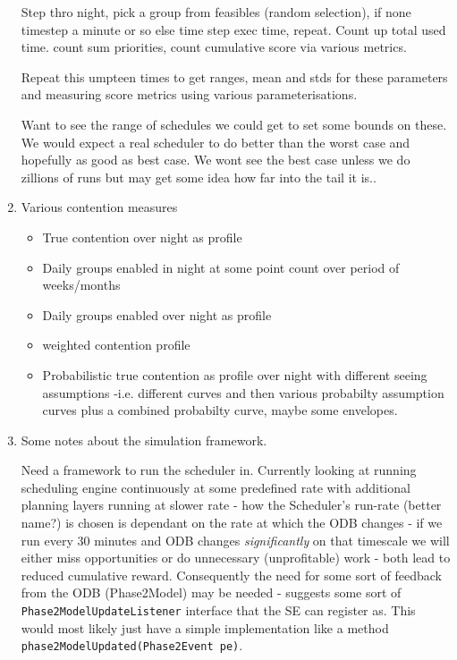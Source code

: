 \begin{enumerate}
Step thro night, pick a group from feasibles (random selection), if none timestep a minute or so else time step exec time, repeat.
Count up total used time. count sum priorities, count cumulative score via various metrics.

Repeat this umpteen times to get ranges, mean and stds for these parameters and measuring score metrics using various parameterisations.

Want to see the range of schedules we could get to set some bounds on these. We would expect a real scheduler to do better than the worst case and hopefully as good as best case. We wont see the best case unless we do zillions of runs but may get some idea how far into the tail it is..

\item Various contention measures

\begin{itemize}
\item True contention over night as profile
\item Daily groups enabled in night at some point count over period of weeks/months
\item Daily groups enabled over night as profile
\item weighted contention profile
\item Probabilistic true contention as profile over night with different seeing assumptions -i.e. different curves and then various probabilty assumption curves plus a combined probabilty curve, maybe some envelopes.
\end{itemize}


\item Some notes about the simulation framework.

Need a framework to run the scheduler in. Currently looking at running scheduling engine continuously at some predefined rate with additional planning layers running at slower rate - how the Scheduler's run-rate (better name?) is chosen is dependant on the rate at which the ODB changes - if we run every 30 minutes and ODB changes \emph{significantly} on that timescale we will either miss opportunities or do unnecessary (unprofitable) work - both lead to reduced cumulative reward. Consequently the need for some sort of feedback from the ODB (Phase2Model) may be needed - suggests some sort of {\tt Phase2ModelUpdateListener} interface that the SE can register as. This would most likely just have a simple implementation like a method {\tt phase2ModelUpdated(Phase2Event pe)}. 


\end{enumerate}
